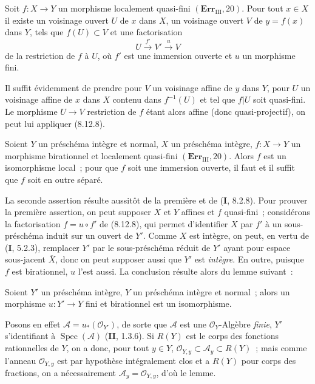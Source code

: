 \begin{corollary}[8.12.9]
\label{IV.8.12.9-fr}
Soit $f:X\to Y$ un morphisme localement quasi-fini
$(\mathbf{Err}_{\mathrm{III}}, 20)$. Pour tout $x\in X$ il existe un
voisinage ouvert $U$ de $x$ dans $X$, un voisinage ouvert $V$ de
$y=f(x)$ dans $Y$, tels que $f(U)\subset V$ et une factorisation
\[
U\xrightarrow{f'}V'\xrightarrow{u}V
\]
de la restriction de $f$ à $U$, où $f'$ est une immersion ouverte et $u$ un
morphisme fini.
\end{corollary}

Il suffit évidemment de prendre pour $V$ un voisinage affine de $y$ dans
$Y$, pour $U$ un voisinage affine de $x$ dans $X$ contenu dans $f^{-1}(U)$
et tel que $f|U$ soit quasi-fini. Le morphisme $U\to V$ restriction de $f$
étant alors affine (donc quasi-projectif), on peut lui appliquer (8.12.8).

\begin{corollary}[8.12.10]
Soient $Y$ un préschéma intègre et normal, $X$ un préschéma intègre,
$f:X\to Y$ un morphisme birationnel et localement quasi-fini
$(\mathbf{Err}_{\mathrm{III}}, 20)$. Alors $f$ est un isomorphisme local~;
pour que $f$ soit une immersion ouverte, il faut et il suffit que $f$ soit
en outre séparé.
\end{corollary}

La seconde assertion résulte aussitôt de la première et de (\textbf{I}, 8.2.8). Pour
prouver la première assertion, on peut supposer $X$ et $Y$ affines et $f$
quasi-fini~; considérons la factorisation $f=u\circ f'$ de (8.12.8), qui
permet d'identifier $X$ par $f'$ à un sous-préschéma induit sur un ouvert de
$Y'$. Comme $X$ est intègre, on peut, en vertu de (\textbf{I}, 5.2.3), remplacer
$Y'$ par le sous-préschéma réduit de $Y'$ ayant pour espace sous-jacent
$\overline X$, donc on peut supposer aussi que $Y'$ est \emph{intègre}. En
outre, puisque $f$ est birationnel, $u$ l'est aussi. La conclusion résulte
alors du lemme suivant~:

\begin{lemma}[8.12.10.1]
\label{IV.8.12.10.1-fr}
Soient $Y'$ un préschéma intègre, $Y$ un préschéma intègre et normal~; alors
un morphisme $u:Y'\to Y$ fini et birationnel est un isomorphisme.
\end{lemma}

Posons en effet $\mathcal A=u_*(\mathcal O_{Y'})$, de sorte que $\mathcal A$
est une $\mathcal O_Y$-Algèbre \emph{finie}, $Y'$ s'identifiant à
$\operatorname{Spec}(\mathcal A)$ (\textbf{II}, 1.3.6). Si $R(Y)$ est le corps des
fonctions rationnelles de $Y$, on a donc, pour tout $y\in Y$,
$\mathcal O_{Y,y}\subset\mathcal A_y\subset R(Y)$~; mais comme l'anneau
$\mathcal O_{Y,y}$ est par hypothèse intégralement clos et a $R(Y)$ pour
corps des fractions, on a nécessairement
$\mathcal A_y=\mathcal O_{Y,y}$, d'où le lemme.

